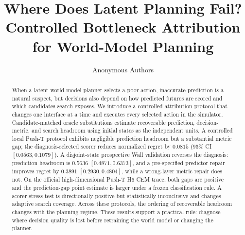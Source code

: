\documentclass{article}
\title{Where Does Latent Planning Fail?\\
Controlled Bottleneck Attribution for World-Model Planning}
\author{Anonymous Authors}
\begin{document}
\maketitle

\begin{abstract}
When a latent world-model planner selects a poor action, inaccurate prediction is a natural suspect, but decisions also depend on how predicted futures are scored and which candidates search exposes. We introduce a controlled attribution protocol that changes one interface at a time and executes every selected action in the simulator. Candidate-matched oracle substitutions estimate recoverable prediction, decision-metric, and search headroom using initial states as the independent units. A controlled local Push-T protocol exhibits negligible prediction headroom but a substantial metric gap; the diagnosis-selected scorer reduces normalized regret by $0.0815$ (95\% CI $[0.0563,0.1079]$). A disjoint-state prospective Wall validation reverses the diagnosis: prediction headroom is $0.5636$ $[0.4871,0.6373]$, and a pre-specified predictor repair improves regret by $0.3891$ $[0.2930,0.4804]$, while a wrong-layer metric repair does not. On the official high-dimensional Push-T H6 CEM trace, both gaps are positive and the prediction-gap point estimate is larger under a frozen classification rule. A scorer stress test is directionally positive but statistically inconclusive and changes adaptive search coverage. Across these protocols, the ordering of recoverable headroom changes with the planning regime. These results support a practical rule: diagnose where decision quality is lost before retraining the world model or changing the planner.
\end{abstract}









\label{maintext-end}
\FloatBarrier
\clearpage



\clearpage
\appendix

\end{document}
